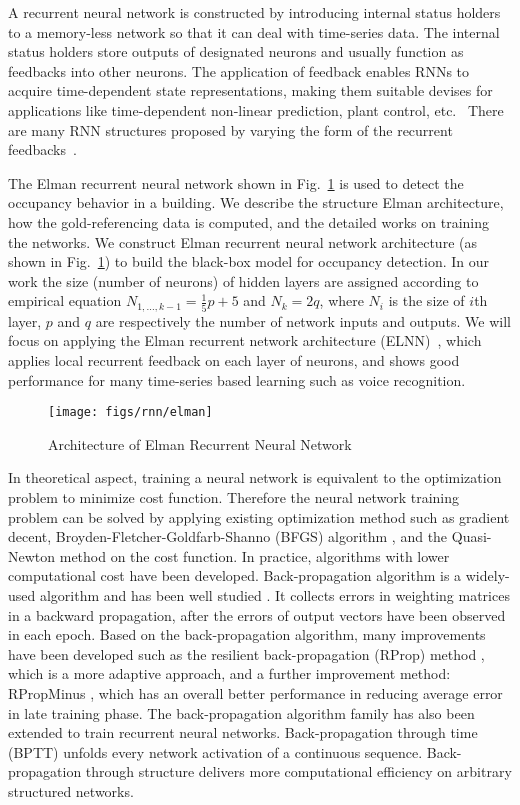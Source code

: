 A recurrent neural network is constructed by introducing
internal status holders to a memory-less network so that it can deal
with time-series data. The internal status holders store outputs of
designated neurons and usually function as feedbacks into other
neurons. The application of feedback enables RNNs to acquire
time-dependent state representations, making them suitable devises for
applications like time-dependent non-linear prediction, plant control,
etc.~\cite{haykin2004compreh} There are many RNN structures
proposed by varying the form of the recurrent
feedbacks~\cite{elman1990finding,haykin2004compreh,puskorius1996dynamic}.

The Elman recurrent neural network shown in
Fig.~\ref{fig:elman} is used to detect the occupancy behavior in a building.
We describe the structure Elman architecture, how the gold-referencing data is
computed, and the detailed works on training the networks. We construct Elman recurrent neural network architecture (as shown in Fig.~\ref{fig:elman}) to build the black-box model for occupancy detection. In
our work the size (number of neurons) of hidden layers are assigned according
to empirical equation $N_{1,\ldots,k-1}=\frac15p+5$ and $N_k=2q$, where $N_i$
is the size of $i$th layer, $p$ and $q$ are respectively the number of network
inputs and outputs. We will focus on applying the Elman recurrent network
architecture (ELNN)~\cite{elman1990finding}, which applies local
recurrent feedback on each layer of neurons, and shows good
performance for many time-series based learning such as voice
recognition.

\begin{figure}[t]
    \centering
    \texttt{[image: figs/rnn/elman]}
    \caption{Architecture of Elman Recurrent Neural Network}
    \label{fig:elman}
\end{figure}


In theoretical aspect, training a neural network is equivalent to the optimization problem to minimize cost function. Therefore the neural network training problem can be solved by applying existing optimization method such as gradient decent, Broyden-Fletcher-Goldfarb-Shanno (BFGS) algorithm
\cite{heath2010sci}, and the Quasi-Newton method on the cost function. In
practice, algorithms with lower computational cost have been developed.
Back-propagation algorithm is a widely-used algorithm and has been well studied
\cite{hecht1988backprop}. It collects errors in weighting matrices in a
backward propagation, after the errors of output vectors have been observed in
each epoch. Based on the back-propagation algorithm, many improvements have
been developed such as the resilient back-propagation (RProp) method
\cite{riedmiller1993direct}, which is a more adaptive approach, and a further
improvement method: RPropMinus \cite{igel2003empirical}, which has an overall
better performance in reducing average error in late training phase. The
back-propagation algorithm family has also been extended to train recurrent
neural networks. Back-propagation through time (BPTT) \cite{werbos1990backprop}
unfolds every network activation of a continuous sequence. Back-propagation
through structure delivers more computational efficiency on arbitrary
structured networks.
